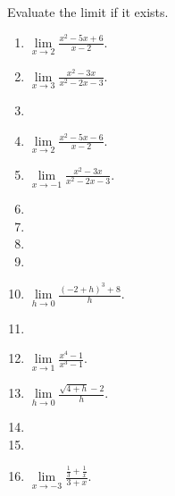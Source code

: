 Evaluate the limit if it exists.
\begin{multicols}{2}
\begin{enumerate}[ref={\fcProblemRef}]
\item \label{problemlim(xto2)(x^2-5x+6)/(x-2)}
$\displaystyle\lim\limits_{x\to 2}\frac{x^2-5x+6}{x-2} $. 

\item $\displaystyle\lim\limits_{x\to 3}\frac{x^2-3x}{x^2-2x-3} $.

\item 
\item $\displaystyle\lim\limits_{x\to 2}\frac{x^2-5x-6}{x-2} $.

\item $\displaystyle\lim\limits_{x\to -1}\frac{x^2-3x}{x^{2}-2x-3} $.


\item 
\item 
\item 


\item 
\item $\displaystyle\lim\limits_{h\to 0}\frac{(-2+h)^3+8}{h} $.

\item 
\item $\displaystyle\lim\limits_{x\to 1}\frac{x^4-1}{x^3-1} $.

\item $\displaystyle\lim\limits_{h\to 0}\frac{\sqrt{4+h}-2}{h} $.

\item 
\item 
\item $\displaystyle\lim\limits_{x\to -3} \frac{\frac{1}{3}+ \frac{1}{x}} {3+x}$.


\end{enumerate}
\end{multicols}
